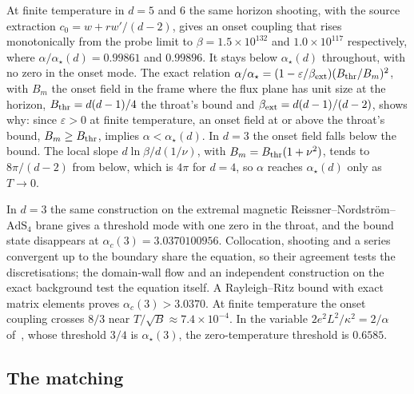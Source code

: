 At finite temperature in $d = 5$ and $6$ the same horizon shooting, with
the source extraction $c_0 = w + r w'/(d-2)$, gives an onset coupling that
rises monotonically from the probe limit to $\beta = 1.5\times10^{132}$
and $1.0\times10^{117}$ respectively, where $\alpha/\alpha_\star(d) = 0.99861$
and $0.99896$. It stays below $\alpha_\star(d)$ throughout, with no zero in
the onset mode. The exact relation
$\alpha/\alpha_\star = (1 - \varepsilon/\beta_{\rm ext})(B_{\rm thr}/B_m)^2$,
with $B_m$ the onset field in the frame where the flux plane has unit size
at the horizon, $B_{\rm thr} = d(d-1)/4$ the throat's bound and
$\beta_{\rm ext} = d(d-1)/(d-2)$, shows why: since $\varepsilon > 0$ at
finite temperature, an onset field at or above the throat's bound,
$B_m \ge B_{\rm thr}$, implies $\alpha < \alpha_\star(d)$. In $d = 3$ the
onset field falls below the bound. The local slope
$d\ln\beta/d(1/\nu)$, with $B_m = B_{\rm thr}(1 + \nu^2)$, tends to
$8\pi/(d-2)$ from below, which is $4\pi$ for $d = 4$, so $\alpha$ reaches
$\alpha_\star(d)$ only as $T \to 0$.

In $d = 3$ the same construction on the extremal magnetic
Reissner--Nordstr\"om--$\mathrm{AdS}_4$ brane gives a threshold mode with
one zero in the throat, and the bound state disappears at
$\alpha_c(3) = 3.0370100956$. Collocation, shooting and a series
convergent up to the boundary share the equation, so their agreement tests
the discretisations; the domain-wall flow and an independent construction
on the exact background test the equation itself. A Rayleigh--Ritz bound
with exact matrix elements proves $\alpha_c(3) > 3.0370$. At finite
temperature the onset coupling crosses $8/3$ near
$T/\sqrt B \approx 7.4\times10^{-4}$. In the variable
$2e^2L^2/\kappa^2 = 2/\alpha$ of~\cite{Wong:2013rda}, whose threshold
$3/4$ is $\alpha_\star(3)$, the zero-temperature threshold is $0.6585$.

\subsection{The matching}
\label{app:numerics-matching}

